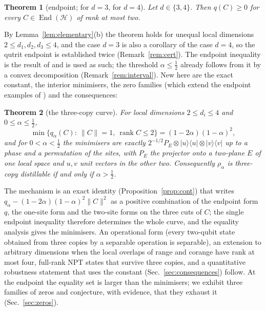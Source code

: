 \documentclass[aps,pra,twocolumn,superscriptaddress,nofootinbib,longbibliography]{revtex4-2}
\newcommand{\Hh}{\mathcal H}
\newcommand{\ket}[1]{|#1\rangle}
\newcommand{\bra}[1]{\langle #1|}
\DeclareMathOperator{\rank}{rank}
\DeclareMathOperator{\End}{End}
\theoremstyle{plain}
\newtheorem{theorem}{Theorem}[section]
\theoremstyle{definition}
\theoremstyle{remark}
\begin{document}
\begin{theorem}[endpoint; \cite{Zenodo} for $d=3$, \cite{Liu} for $d=4$]\label{thm:endpoint}
Let $d\in\{3,4\}$. Then $q(C)\ge0$ for every $C\in\End(\Hh)$ of rank at most two.
\end{theorem}

By Lemma~\ref{lem:elementary}(b) the theorem holds for unequal local dimensions $2\le d_1,d_2,d_3\le4$, and the case $d=3$ is also a corollary of the case $d=4$, so the qutrit endpoint is established twice (Remark~\ref{rem:cert}). The endpoint inequality is the result of \cite{Zenodo,Liu} and is used as such; the threshold $\alpha\le\tfrac12$ already follows from it by a convex decomposition (Remark~\ref{rem:interval}). New here are the exact constant, the interior minimisers, the zero families (which extend the endpoint examples of \cite{WuZou}) and the consequences:

\begin{theorem}[the three-copy curve]\label{thm:curve}
For local dimensions $2\le d_i\le4$ and $0\le\alpha\le\tfrac12$,
\begin{equation}\label{eq:curve}
\min\{q_\alpha(C):\ \|C\|=1,\ \rank C\le2\}=(1-2\alpha)(1-\alpha)^2 ,
\end{equation}
and for $0<\alpha<\tfrac12$ the minimisers are exactly $2^{-1/2}P_E\otimes\ket u\bra u\otimes\ket v\bra v$ up to a phase and a permutation of the sites, with $P_E$ the projector onto a two-plane $E$ of one local space and $u,v$ unit vectors in the other two. Consequently $\rho_\alpha$ is three-copy distillable if and only if $\alpha>\tfrac12$.
\end{theorem}

The mechanism is an exact identity (Proposition~\ref{prop:cont}) that writes $q_\alpha-(1-2\alpha)(1-\alpha)^2\|C\|^2$ as a positive combination of the endpoint form $q$, the one-site form and the two-site forms on the three cuts of $C$; the single endpoint inequality therefore determines the whole curve, and the equality analysis gives the minimisers. An operational form (every two-qubit state obtained from three copies by a separable operation is separable), an extension to arbitrary dimensions when the local overlaps of range and corange have rank at most four, full-rank NPT states that survive three copies, and a quantitative robustness statement that uses the constant (Sec.~\ref{sec:consequences}) follow. At the endpoint the equality set is larger than the minimisers; we exhibit three families of zeros and conjecture, with evidence, that they exhaust it (Sec.~\ref{sec:zeros}).
\end{document}

